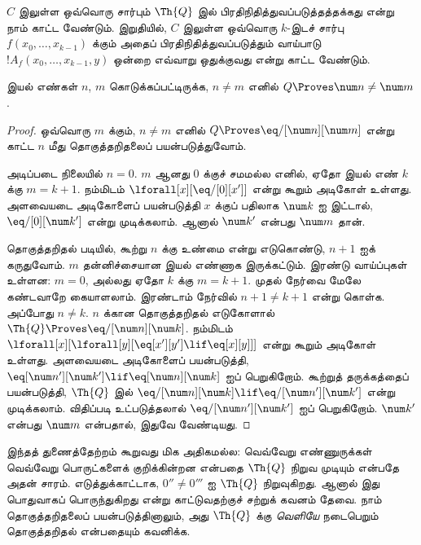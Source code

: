 \documentclass[../../../include/open-logic-section]{subfiles}
\begin{document}

$C$ இலுள்ள ஒவ்வொரு சார்பும் $\Th{Q}$ இல் பிரதிநிதித்துவப்படுத்தத்தக்கது
என்று நாம் காட்ட வேண்டும். இறுதியில், $C$ இலுள்ள ஒவ்வொரு $k$-இடச்
சார்பு $f(x_0,\dots,x_{k-1})$ க்கும் அதைப் பிரதிநிதித்துவப்படுத்தும்
வாய்பாடு $!A_f(x_0,\dots,x_{k-1},y)$ ஒன்றை எவ்வாறு ஒதுக்குவது என்று
காட்ட வேண்டும்.

\begin{lem}
இயல் எண்கள் $n$, $m$ கொடுக்கப்பட்டிருக்க, $n \neq m$ எனில்
$Q \Proves \num n \neq \num m$.
\end{lem}

\begin{proof}
ஒவ்வொரு $m$ க்கும், $n \neq m$ எனில்
$Q \Proves \eq/[\num n][\num m]$ என்று காட்ட $n$ மீது
தொகுத்தறிதலைப் பயன்படுத்துவோம்.

அடிப்படை நிலையில் $n = 0$. $m$ ஆனது $0$ க்குச் சமமல்ல எனில், ஏதோ
இயல் எண் $k$ க்கு $m = k + 1$. நம்மிடம்
$\lforall[x][\eq/[0][x']]$ என்று கூறும் அடிகோள் உள்ளது.
அளவையடை அடிகோளைப் பயன்படுத்தி $x$ க்குப் பதிலாக $\num k$ ஐ இட்டால்,
$\eq/[0][\num k']$ என்று முடிக்கலாம். ஆனால் $\num k'$ என்பது
$\num m$ தான்.

தொகுத்தறிதல் படியில், கூற்று $n$ க்கு உண்மை என்று எடுகொண்டு,
$n+1$ ஐக் கருதுவோம். $m$ தன்னிச்சையான இயல் எண்ணாக இருக்கட்டும்.
இரண்டு வாய்ப்புகள் உள்ளன: $m = 0$, அல்லது ஏதோ $k$ க்கு
$m = k+1$. முதல் நேர்வை மேலே கண்டவாறே கையாளலாம். இரண்டாம் நேர்வில்
$n+1 \neq k+1$ என்று கொள்க. அப்போது $n \neq k$.
$n$ க்கான தொகுத்தறிதல் எடுகோளால்
$\Th{Q} \Proves \eq/[\num n][\num k]$. நம்மிடம்
$\lforall[x][\lforall[y][\eq[x'][y'] \lif \eq[x][y]]]$
என்று கூறும் அடிகோள் உள்ளது. அளவையடை அடிகோளைப் பயன்படுத்தி,
$\eq[\num n'][\num k'] \lif \eq[\num n][\num
  k]$ ஐப் பெறுகிறோம். கூற்றுத் தருக்கத்தைப் பயன்படுத்தி,
$\Th{Q}$ இல்
$\eq/[\num n][\num k] \lif \eq/[\num n'][\num k']$
என்று முடிக்கலாம். விதிப்படி உட்படுத்தலால்
$\eq/[\num n'][\num k']$ ஐப் பெறுகிறோம். $\num k'$ என்பது
$\num m$ என்பதால், இதுவே வேண்டியது.
\end{proof}

இந்தத் துணைத்தேற்றம் கூறுவது மிக அதிகமல்ல: வெவ்வேறு எண்ணுருக்கள்
வெவ்வேறு பொருட்களைக் குறிக்கின்றன என்பதை $\Th{Q}$ நிறுவ முடியும்
என்பதே அதன் சாரம். எடுத்துக்காட்டாக, $0'' \neq 0'''$ ஐ
$\Th{Q}$ நிறுவுகிறது. ஆனால் இது பொதுவாகப் பொருந்துகிறது என்று
காட்டுவதற்குச் சற்றுக் கவனம் தேவை. நாம் தொகுத்தறிதலைப் பயன்படுத்தினாலும்,
அது $\Th{Q}$ க்கு \emph{வெளியே} நடைபெறும் தொகுத்தறிதல் என்பதையும்
கவனிக்க.
\end{document}
